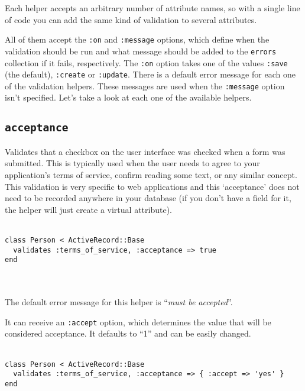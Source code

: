 \documentclass[10pt]{book}
\begin{document}
Each helper accepts an arbitrary number of attribute names, so with a  single line of code you can add the same kind of validation to several  attributes.

All of them accept the \texttt{:on} and \texttt{:message} options, which define when the validation should be run and what message should be added to the \texttt{errors} collection if it fails, respectively. The \texttt{:on} option takes one of the values \texttt{:save} (the default), \texttt{:create}  or \texttt{:update}. There is a default error message for each one of the validation helpers. These messages are used when the \texttt{:message} option isn’t specified. Let’s take a look at each one of the available helpers.

\subsection{ \texttt{acceptance}}

Validates that a checkbox on the user interface was checked when a  form was submitted. This is typically used when the user needs to agree  to your application’s terms of service, confirm reading some text, or  any similar concept. This validation is very specific to web  applications and this ‘acceptance’ does not need to be recorded anywhere  in your database (if you don’t have a field for it, the helper will  just create a virtual attribute).
\\ \\
\begin{minipage}{\textwidth}{\scriptsize
\begin{verbatim}
class Person < ActiveRecord::Base
  validates :terms_of_service, :acceptance => true
end
\end{verbatim}}
\end{minipage}
\\ \\

The default error message for this helper is “\emph{must be accepted}”.

It can receive an \texttt{:accept} option, which determines the value that will be considered acceptance. It defaults to “1” and can be easily changed.
\\ \\
\begin{minipage}{\textwidth}{\scriptsize
\begin{verbatim}
class Person < ActiveRecord::Base
  validates :terms_of_service, :acceptance => { :accept => 'yes' }
end
\end{verbatim}}
\end{minipage}
\\ \\
\end{document}
